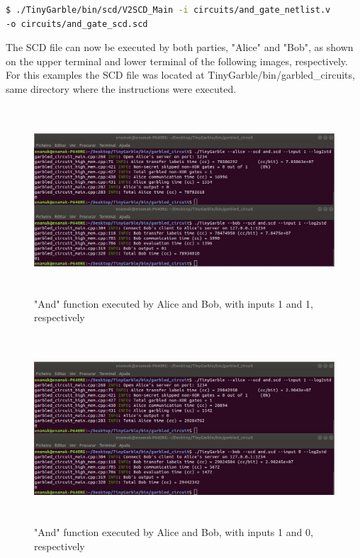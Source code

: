 \begin{refsection}
\begin{lstlisting}[caption={Installation of Yosys-abc}, language=bash, captionpos=b] 
$ ./TinyGarble/bin/scd/V2SCD_Main -i circuits/and_gate_netlist.v 
-o circuits/and_gate_scd.scd		
\end{lstlisting}

\newpage

The SCD file can now be executed by both parties, "Alice" and "Bob", as shown on the upper terminal and lower terminal of the following images, respectively.
For this examples the SCD file was located at TinyGarble/bin/garbled\_circuits, same directory where the instructions were executed.

\begin{figure}[H]
	\centering
	\includegraphics[width=1\textwidth, height=7cm]{./sdf/secure_multiparty_computation/figures/tinygarble_and_a.png}
    \caption{"And" function executed by Alice and Bob, with inputs 1 and 1, respectively}\label{fig:tinygarble_and_a}
\end{figure}

\begin{figure}[H]
	\centering
	\includegraphics[width=1\textwidth, height=7cm]{./sdf/secure_multiparty_computation/figures/tinygarble_and_b.png}
    \caption{"And" function executed by Alice and Bob, with inputs 1 and 0, respectively}\label{fig:tinygarble_and_b}
\end{figure}


\end{refsection}
